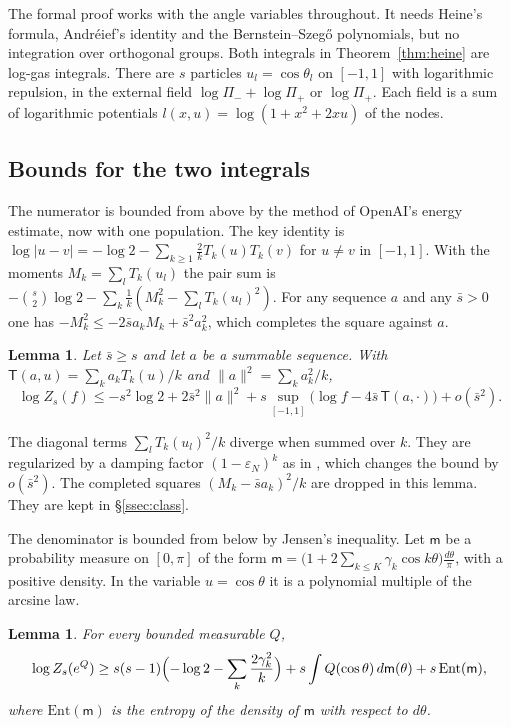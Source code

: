 \documentclass[11pt]{amsart}
\newtheorem{lemma}[theorem]{Lemma}
\theoremstyle{definition}
\theoremstyle{remark}
\numberwithin{equation}{section}
\begin{document}
The formal proof works with the angle variables throughout. It needs Heine's formula, Andr\'eief's identity
and the Bernstein--Szeg\H{o} polynomials, but no integration over orthogonal groups. Both integrals in
Theorem~\ref{thm:heine} are log-gas integrals. There are $s$ particles $u_l=\cos\theta_l$ on $[-1,1]$ with
logarithmic repulsion, in the external field $\log\Pi_-+\log\Pi_+$ or $\log\Pi_+$. Each field is a sum of
logarithmic potentials $l(x,u)=\log(1+x^2+2xu)$ of the nodes.

\subsection{Bounds for the two integrals}\label{ssec:loggas}
The numerator is bounded from above by the method of OpenAI's energy estimate, now with one population. The
key identity is $\log|u-v|=-\log2-\sum_{k\ge1}\frac2kT_k(u)T_k(v)$ for $u\ne v$ in $[-1,1]$. With the moments
$M_k=\sum_lT_k(u_l)$ the pair sum is $-\binom s2\log2-\sum_k\frac1k(M_k^2-\sum_lT_k(u_l)^2)$. For any sequence
$a$ and any $\bar s>0$ one has $-M_k^2\le-2\bar sa_kM_k+\bar s^2a_k^2$, which completes the square against $a$.

\begin{lemma}\label{lem:LGup}
Let $\bar s\ge s$ and let $a$ be a summable sequence. With $\mathsf T(a,u)=\sum_ka_kT_k(u)/k$ and
$\|a\|^2=\sum_ka_k^2/k$,
\[
 \log Z_s(f)\le-s^2\log2+2\bar s^2\|a\|^2+s\sup_{[-1,1]}\bigl(\log f-4\bar s\,\mathsf T(a,\cdot)\bigr)+o(\bar s^2).
\]
\end{lemma}

The diagonal terms $\sum_lT_k(u_l)^2/k$ diverge when summed over $k$. They are regularized by a damping factor
$(1-\varepsilon_N)^k$ as in \cite[Prop.~6.1]{OpenAI2026}, which changes the bound by $o(\bar s^2)$. The completed
squares $(M_k-\bar sa_k)^2/k$ are dropped in this lemma. They are kept in \S\ref{ssec:class}.

The denominator is bounded from below by Jensen's inequality. Let $\mathsf m$ be a probability measure on
$[0,\pi]$ of the form $\mathsf m=\bigl(1+2\sum_{k\le K}\gamma_k\cos k\theta\bigr)\frac{d\theta}\pi$, with a positive
density. In the variable $u=\cos\theta$ it is a polynomial multiple of the arcsine law.

\begin{lemma}\label{lem:LGlow}
For every bounded measurable $Q$,
\[
 \log Z_s(e^Q)\ge s(s-1)\Bigl(-\log2-\sum_k\frac{2\gamma_k^2}k\Bigr)+s\int Q(\cos\theta)\,d\mathsf m(\theta)+s\,\mathrm{Ent}(\mathsf m),
\]
where $\mathrm{Ent}(\mathsf m)$ is the entropy of the density of $\mathsf m$ with respect to $d\theta$.
\end{lemma}
\end{document}
